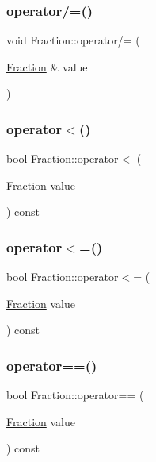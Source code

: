 \subsubsection{\texorpdfstring{operator/=()}{operator/=()}}
{\footnotesize\ttfamily void Fraction\+::operator/= (\begin{DoxyParamCaption}\item[{\hyperlink{class_fraction}{Fraction} \&}]{value }\end{DoxyParamCaption})}

\hypertarget{class_fraction_a7a122e21981f269280383178adce2868}{}\label{class_fraction_a7a122e21981f269280383178adce2868} 
\subsubsection{\texorpdfstring{operator$<$()}{operator<()}}
{\footnotesize\ttfamily bool Fraction\+::operator$<$ (\begin{DoxyParamCaption}\item[{\hyperlink{class_fraction}{Fraction}}]{value }\end{DoxyParamCaption}) const}

\hypertarget{class_fraction_aa1a199c08a893bfb787a5b5a9915ba8b}{}\label{class_fraction_aa1a199c08a893bfb787a5b5a9915ba8b} 
\subsubsection{\texorpdfstring{operator$<$=()}{operator<=()}}
{\footnotesize\ttfamily bool Fraction\+::operator$<$= (\begin{DoxyParamCaption}\item[{\hyperlink{class_fraction}{Fraction}}]{value }\end{DoxyParamCaption}) const}

\hypertarget{class_fraction_ac652d0394b5c8f0046a975bf7ea1b60b}{}\label{class_fraction_ac652d0394b5c8f0046a975bf7ea1b60b} 
\subsubsection{\texorpdfstring{operator==()}{operator==()}}
{\footnotesize\ttfamily bool Fraction\+::operator== (\begin{DoxyParamCaption}\item[{\hyperlink{class_fraction}{Fraction}}]{value }\end{DoxyParamCaption}) const}


